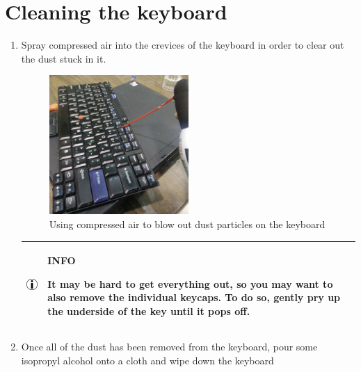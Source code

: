 \documentclass{article}
\newcommand{\alertinfobox}[2]{
	\begin{center}
		\begin{tabularx}{0.9\linewidth}{| c X |}
			\hline
			\raisebox{\dimexpr2\baselineskip-\height}
			{\includegraphics[width=0.5in]{info.jpg}}&
			\raisebox{\tabcolsep}{\strut}\par\textbf{#1}\par#2\raisebox{-\tabcolsep}{\strut} \\ \hline
		\end{tabularx}
	\end{center}
}
\begin{document}
\section*{Cleaning the keyboard}
\begin{enumerate}
	\item Spray compressed air into the crevices of the keyboard in order to clear out the dust stuck in it.

	\begin{figure}[H]
		\centering
		\includegraphics[width=0.5\textwidth]{aircankeyboard.jpg}
		\caption{Using compressed air to blow out dust particles on the keyboard}
	\end{figure}

	\alertinfobox{INFO}{
		It may be hard to get everything out, so you may want to also remove the individual keycaps.
		To do so, gently pry up the underside of the key until it pops off.
	}

	\item Once all of the dust has been removed from the keyboard, pour some isopropyl alcohol onto a cloth and wipe down the keyboard

\end{enumerate}

\clearpage
\end{document}
